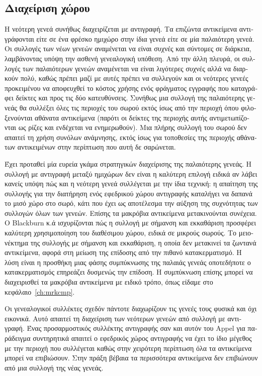 \begin{greek}
\section{Διαχείριση χώρου}
Η νεότερη γενεά συνήθως διαχειρίζεται με αντιγραφή. Τα επιζώντα
αντικείμενα αντιγράφονται είτε σε ένα φρέσκο ημιχώρο στην
ίδια γενεά είτε σε μία παλαιότερη γενεά. Οι συλλογές των
νέων γενεών αναμένεται να είναι συχνές και σύντομες σε διάρκεια,
λαμβάνοντας υπόψη την ασθενή γενεαλογική υπόθεση. Από την άλλη
πλευρά, οι συλλογές των παλαιότερων γενεών αναμένεται να είναι
λιγότερες συχνές αλλά να διαρκούν πολύ, καθώς πρέπει μαζί με
αυτές πρέπει να συλλεγούν και οι νεότερες γενεές προκειμένου
να αποφευχθεί το κόστος χρήσης ενός φράγματος εγγραφής που
καταγράφει δείκτες και προς τις δύο κατευθύνσεις. Συνήθως
μια συλλογή της παλαιότερης γενεάς θα συλλέξει όλες τις περιοχές
του σωρού εκτός ίσως από την περιοχή όπου φιλοξενούνται αθάνατα
αντικείμενα (παρότι οι δείκτες της περιοχής αυτής αντιμετωπίζονται
ως ρίζες και ενδέχεται να ενημερωθούν). Μια πλήρης συλλογή του
σωρού δεν απαιτεί τη χρήση συνόλων ανάμνησης, εκτός ίσως για
τοποθεσίες της περιοχής αθάνατων αντικειμένων στην περίπτωση
που αυτή δε σαρώνεται.

Έχει προταθεί μία ευρεία γκάμα στρατηγικών διαχείρισης της
παλαιότερης γενεάς. Η συλλογή με αντιγραφή μεταξύ ημιχώρων
δεν είναι η καλύτερη επιλογή ειδικά αν λάβει κανείς υπόψη
πώς και η νεότερη γενεά συλλέγεται με την ίδια τεχνική: η
απαίτηση της συλλογής για την διατήρηση ενός εφεδρικού χώρου
αντιγραφής καταλήγει να δαπανά το μισό χώρο στο σωρό, κάτι
που έχει ως αποτέλεσμα την αύξηση της συχνότητας των συλλογών
όλων των γενεών. Επίσης τα μακρόβια αντικείμενα μετακινούνται
συνέχεια. Ο Blackburn κ.ά ισχυρίζονται \cite{DBLP:conf/icse/BlackburnCM04}
πώς η συλλογή με σήμανση και εκκαθάριση προσφέρει καλύτερη
χρησιμοποίηση του διαθέσιμου χώρου, ειδικά σε μικρούς σωρούς.
Το μειονέκτημα της συλλογής με σήμανση και εκκαθάριση, η οποία
δεν μετακινεί τα ζωντανά αντικείμενα, αφορά στη μείωση της
επίδοσης από την πιθανό κατακερματισμό. Η λύση είναι η προσθήκη
μιας φάσης συμπύκνωσης της παλαιάς γενεάς οποτεδήποτε ο
κατακερματισμός επηρεάζει δυσμενώς την επίδοση. Η συμπύκνωση
επίσης μπορεί να διαχειρισθεί τα μακρόβια αντικείμενα με
ειδικό τρόπο, όπως είδαμε στο κεφάλαιο~\ref{ch:mrkcmp}.

Οι γενεαλογικοί συλλέκτες σχεδόν πάντοτε διαχωρίζουν τις
γενεές τους φυσικά και όχι εικονικά. Αυτό απαιτεί τη διαχείριση
των νεότερων γενεών από συλλογή με αντιγραφή. Ένας προσαρμοστικός
συλλέκτης αντιγραφής σαν και αυτόν του Appel για παράδειγμα
συντηρητικά απαιτεί ο εφεδρικός χώρος αντιγραφής να έχει το
ίδιο μέγεθος με την περιοχή που συλλέγεται καθώς στην χειρότερη
περίπτωση όλα τα αντικείμενα μπορεί να επιβιώσουν. Στην πράξη
βέβαια τα περισσότερα αντικείμενα δεν επιβιώνουν από μια συλλογή
της νέας γενεάς.


\end{greek}
